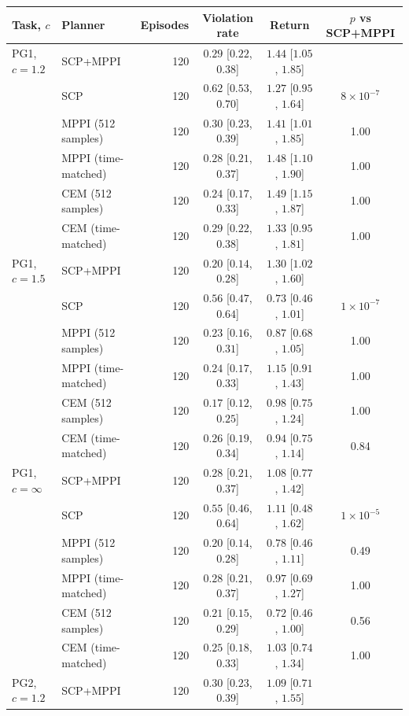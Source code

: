 \begin{tabular}{llrccc}
\toprule
Task, $c$ & Planner & Episodes & Violation rate & Return & $p$ vs SCP+MPPI \\
\midrule
PG1, $c=1.2$ & SCP+MPPI & 120 & $0.29$ [$0.22$, $0.38$] & $1.44$ [$1.05$, $1.85$] &  \\
 & SCP & 120 & $0.62$ [$0.53$, $0.70$] & $1.27$ [$0.95$, $1.64$] & $8\times 10^{-7}$ \\
 & MPPI (512 samples) & 120 & $0.30$ [$0.23$, $0.39$] & $1.41$ [$1.01$, $1.85$] & 1.00 \\
 & MPPI (time-matched) & 120 & $0.28$ [$0.21$, $0.37$] & $1.48$ [$1.10$, $1.90$] & 1.00 \\
 & CEM (512 samples) & 120 & $0.24$ [$0.17$, $0.33$] & $1.49$ [$1.15$, $1.87$] & 1.00 \\
 & CEM (time-matched) & 120 & $0.29$ [$0.22$, $0.38$] & $1.33$ [$0.95$, $1.81$] & 1.00 \\
\midrule
PG1, $c=1.5$ & SCP+MPPI & 120 & $0.20$ [$0.14$, $0.28$] & $1.30$ [$1.02$, $1.60$] &  \\
 & SCP & 120 & $0.56$ [$0.47$, $0.64$] & $0.73$ [$0.46$, $1.01$] & $1\times 10^{-7}$ \\
 & MPPI (512 samples) & 120 & $0.23$ [$0.16$, $0.31$] & $0.87$ [$0.68$, $1.05$] & 1.00 \\
 & MPPI (time-matched) & 120 & $0.24$ [$0.17$, $0.33$] & $1.15$ [$0.91$, $1.43$] & 1.00 \\
 & CEM (512 samples) & 120 & $0.17$ [$0.12$, $0.25$] & $0.98$ [$0.75$, $1.24$] & 1.00 \\
 & CEM (time-matched) & 120 & $0.26$ [$0.19$, $0.34$] & $0.94$ [$0.75$, $1.14$] & 0.84 \\
\midrule
PG1, $c=\infty$ & SCP+MPPI & 120 & $0.28$ [$0.21$, $0.37$] & $1.08$ [$0.77$, $1.42$] &  \\
 & SCP & 120 & $0.55$ [$0.46$, $0.64$] & $1.11$ [$0.48$, $1.62$] & $1\times 10^{-5}$ \\
 & MPPI (512 samples) & 120 & $0.20$ [$0.14$, $0.28$] & $0.78$ [$0.46$, $1.11$] & 0.49 \\
 & MPPI (time-matched) & 120 & $0.28$ [$0.21$, $0.37$] & $0.97$ [$0.69$, $1.27$] & 1.00 \\
 & CEM (512 samples) & 120 & $0.21$ [$0.15$, $0.29$] & $0.72$ [$0.46$, $1.00$] & 0.56 \\
 & CEM (time-matched) & 120 & $0.25$ [$0.18$, $0.33$] & $1.03$ [$0.74$, $1.34$] & 1.00 \\
\midrule
PG2, $c=1.2$ & SCP+MPPI & 120 & $0.30$ [$0.23$, $0.39$] & $1.09$ [$0.71$, $1.55$] &  \\

\end{tabular}
